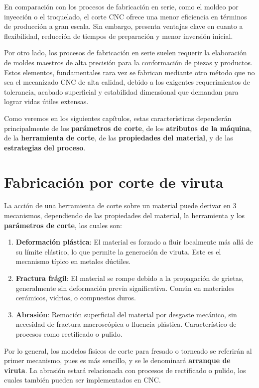En comparación con los procesos de fabricación en serie, como el moldeo por inyección o el troquelado, el corte CNC ofrece una menor eficiencia en términos de producción a gran escala. Sin embargo, presenta ventajas clave en cuanto a flexibilidad, reducción de tiempos de preparación y menor inversión inicial.

Por otro lado, los procesos de fabricación en serie suelen requerir la elaboración de moldes maestros de alta precisión para la conformación de piezas y productos. Estos elementos, fundamentales rara vez se fabrican mediante otro método que no sea el mecanizado CNC de alta calidad, debido a los exigentes requerimientos de tolerancia, acabado superficial y estabilidad dimensional que demandan para lograr vidas útiles extensas.

Como veremos en los siguientes capítulos, estas características dependerán principalmente de los \textbf{parámetros de corte}, de los \textbf{atributos de la máquina}, de la \textbf{herramienta de corte}, de las \textbf{propiedades del material}, y de las \textbf{estrategias del proceso}. 

\section{Fabricación por corte de viruta}

La acción de una herramienta de corte sobre un material puede derivar en 3 mecanismos, dependiendo de las propiedades del material, la herramienta y los \textbf{parámetros de corte}, los cuales son:

\begin{enumerate}
	\item \textbf{Deformación plástica}: El material es forzado a fluir localmente más allá de su límite elástico, lo que permite la generación de viruta. Este es el mecanismo típico en metales dúctiles.
	
	\item \textbf{Fractura frágil}: El material se rompe debido a la propagación de grietas, generalmente sin deformación previa significativa. Común en materiales cerámicos, vidrios, o compuestos duros.
	
	\item \textbf{Abrasión}: Remoción superficial del material por desgaste mecánico, sin necesidad de fractura macroscópica o fluencia plástica. Característico de procesos como rectificado o pulido.
\end{enumerate}

Por lo general, los modelos físicos de corte para fresado o torneado se referirán al primer mecanismo, pues es más sencillo, y se le denominará \textbf{arranque de viruta}. La abrasión estará relacionada con procesos de rectificado o pulido, los cuales también pueden ser implementados en CNC.


